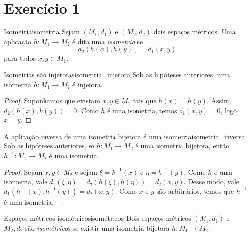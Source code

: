 \section*{Exercício 1}
\begin{definition}{Isometria}{isometria}
    Sejam \((M_1, d_1)\) e \((M_2, d_2)\) dois espaços métricos. Uma aplicação \(h : M_1 \to M_2\) é dita uma \emph{isometria} se
    \begin{equation*}
        d_2(h(x), h(y)) = d_1(x,y)
    \end{equation*}
    para todos \(x,y \in M_1\).
\end{definition}

\begin{proposition}{Isometrias são injetoras}{isometria_injetora}
    Sob as hipóteses anteriores, uma isometria \(h : M_1 \to M_2\) é injetora.
\end{proposition}
\begin{proof}
    Suponhamos que existam \(x, y \in M_1\) tais que \(h(x) = h(y)\). Assim, \(d_2(h(x), h(y)) = 0\). Como \(h\) é uma isometria, temos \(d_1(x,y) = 0\), logo \(x = y\).
\end{proof}

\begin{proposition}{A aplicação inversa de uma isometria bijetora é uma isometria}{isometria_inversa}
    Sob as hipóteses anteriores, se \(h : M_1 \to M_2\) é uma isometria bijetora, então \(h^{-1} : M_1 \to M_2\) é uma isometria.
\end{proposition}
\begin{proof}
    Sejam \(x, y \in M_2\) e sejam \(\xi = h^{-1}(x)\) e \(\eta = h^{-1}(y)\). Como \(h\) é uma isometria, vale \(d_1(\xi, \eta) = d_2(h(\xi),h(\eta)) = d_2(x,y)\). Desse modo, vale \(d_1(h^{-1}(x), h^{-1}(y)) = d_2(x,y)\). Como \(x\) e \(y\) são arbitrários, temos que \(h^{-1}\) é uma isometria.
\end{proof}

\begin{definition}{Espaços métricos isométricos}{isométricos}
    Dois espaços métricos \((M_1, d_1)\) e \(M_2, d_2\) são \emph{isométricos} se existir uma isometria bijetora \(h : M_1 \to M_2\).
\end{definition}

